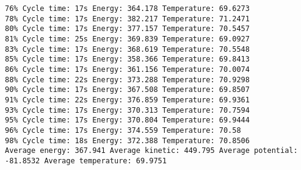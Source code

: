 \documentclass{article}
\begin{document}
\begin{verbatim}
76% Cycle time: 17s Energy: 364.178 Temperature: 69.6273
78% Cycle time: 17s Energy: 382.217 Temperature: 71.2471
80% Cycle time: 17s Energy: 377.157 Temperature: 70.5457
81% Cycle time: 25s Energy: 369.839 Temperature: 69.0927
83% Cycle time: 17s Energy: 368.619 Temperature: 70.5548
85% Cycle time: 17s Energy: 358.366 Temperature: 69.8413
86% Cycle time: 17s Energy: 361.156 Temperature: 70.0074
88% Cycle time: 22s Energy: 373.288 Temperature: 70.9298
90% Cycle time: 17s Energy: 367.508 Temperature: 69.8507
91% Cycle time: 22s Energy: 376.859 Temperature: 69.9361
93% Cycle time: 17s Energy: 370.313 Temperature: 70.7594
95% Cycle time: 17s Energy: 370.804 Temperature: 69.9444
96% Cycle time: 17s Energy: 374.559 Temperature: 70.58
98% Cycle time: 18s Energy: 372.388 Temperature: 70.8506
Average energy: 367.941 Average kinetic: 449.795 Average potential: -81.8532 Average temperature: 69.9751


\end{verbatim}
\end{document}
